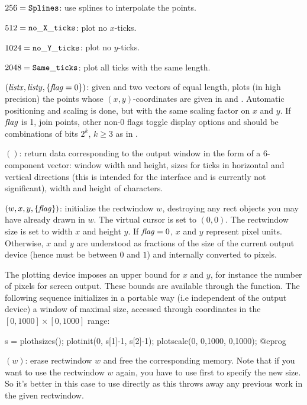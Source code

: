 \item $256 = {\tt Splines}$: use splines to interpolate the points.

\item $512 = {\tt no\_X\_ticks}$: plot no $x$-ticks.

\item $1024 = {\tt no\_Y\_ticks}$: plot no $y$-ticks.

\item $2048 = {\tt Same\_ticks}$: plot all ticks with the same length.

$(\hbox{\it listx\/},\hbox{\it listy\/},\{\hbox{\it f\kern0pt lag\/}=0\})$: given
 and  two vectors of equal length, plots (in high
precision) the points whose $(x,y)$-coordinates are given in 
and . Automatic positioning and scaling is done, but with the
same scaling factor on $x$ and $y$. If $\hbox{\it f\kern0pt lag\/}$ is 1, join points, other non-0
flags toggle display options and should be combinations of bits $2^k$, $k
\geq 3$ as in .

$()$: return data corresponding to the output window
in the form of a 6-component vector: window width and height, sizes for ticks
in horizontal and vertical directions (this is intended for the 
interface and is currently not significant), width and height of characters.

$(w,x,y,\{\hbox{\it f\kern0pt lag\/}\})$: initialize the rectwindow $w$,
destroying any rect objects you may have already drawn in $w$. The virtual
cursor is set to $(0,0)$. The rectwindow size is set to width $x$ and height
$y$. If $\hbox{\it f\kern0pt lag\/}=0$, $x$ and $y$ represent pixel units. Otherwise, $x$ and $y$
are understood as fractions of the size of the current output device (hence
must be between $0$ and $1$) and internally converted to pixels.

The plotting device imposes an upper bound for $x$ and $y$, for instance the
number of pixels for screen output. These bounds are available through the
 function. The following sequence initializes in a portable
way (i.e independent of the output device) a window of maximal size, accessed
through coordinates in the $[0,1000] \times [0,1000]$ range:

\bprog
s = plothsizes();
plotinit(0, s[1]-1, s[2]-1);
plotscale(0, 0,1000, 0,1000);
@eprog

$(w)$: erase rectwindow $w$ and free the corresponding
memory. Note that if you want to use the rectwindow $w$ again, you have to
use  first to specify the new size. So it's better in this case
to use  directly as this throws away any previous work in the
given rectwindow.

